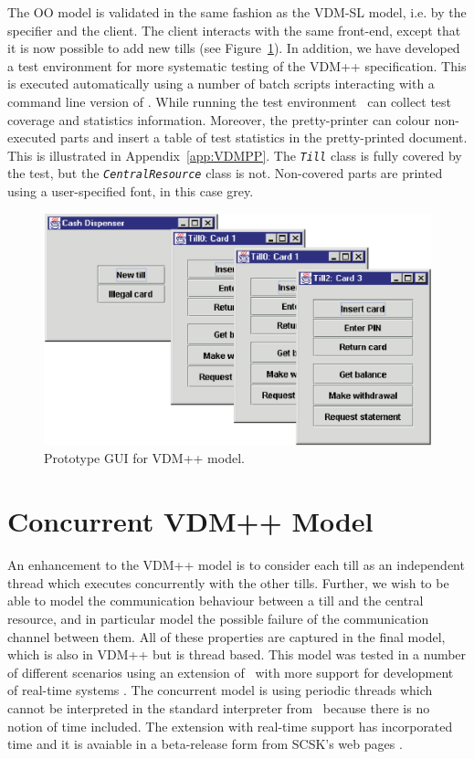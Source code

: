\documentclass[\pformat,12pt,twoside]{article}
\begin{document}
The OO model is validated in the same fashion as the VDM-SL model, 
i.e. by the specifier and the client. The client interacts with 
the same front-end, except that it is now possible to add new 
tills (see Figure~\ref{fig:ppscreen}). In addition, we have developed a test environment for 
more systematic testing of the VDM++ specification. This is executed 
automatically using a number of batch scripts interacting with 
a command line version of \vdmtools. While running 
the test environment \vdmtools\  can collect test 
coverage and statistics information. Moreover, the pretty-printer 
can colour non-executed parts and insert a table of test statistics in 
the pretty-printed document. This is illustrated in
Appendix~\ref{app:VDMPP}.
The \texttt{\emph{Till}} class is fully covered by the test, but the
\texttt{\emph{CentralResource}}
class is not. Non-covered parts are printed using a user-specified
font, in this case grey. 


\begin{figure}[htbp]
\begin{center}
\includegraphics[width=.9\textwidth]{ppscreen}
\caption{Prototype GUI for VDM++ model.\label{fig:ppscreen}}
\end{center}
\end{figure}

\section{Concurrent VDM++ Model}\label{sec:Concur}


An enhancement to the VDM++ model is to consider each till as an
independent thread which executes concurrently with the other
tills. Further, we wish to be able to model the communication
behaviour between a till and the central resource, and in particular
model the possible failure of the communication channel between
them. All of these properties are captured in the final model, which
is also in VDM++ but is thread based. This model was tested in a
number of different scenarios using an extension of \vdmtools\ with
more support for development of real-time systems
\cite{GuidelinesRT,Mukherjee&00}.  The concurrent model is using
periodic threads which cannot be interpreted in the standard
interpreter from \vdmtools\ because there is no notion of time
included. The extension with real-time support has incorporated time
and it is avaiable in a beta-release form from SCSK's web pages
\cite{IFADweb}.
\end{document}
